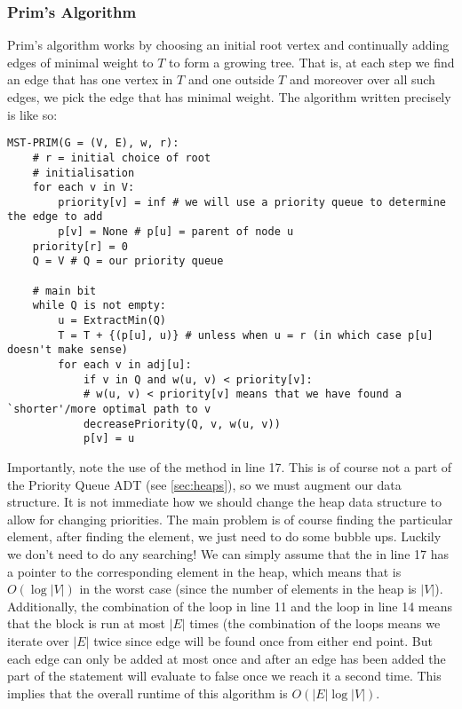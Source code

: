 \subsubsection{Prim's Algorithm}
Prim's algorithm works by choosing an initial root vertex and continually adding edges of minimal weight to $T$ to form a growing tree. That is, at each step we find an edge that has one vertex in $T$ and one outside $T$ and moreover over all such edges, we pick the edge that has minimal weight. The algorithm written precisely is like so:
\begin{lstlisting}
MST-PRIM(G = (V, E), w, r):
    # r = initial choice of root
    # initialisation
    for each v in V:
        priority[v] = inf # we will use a priority queue to determine the edge to add
        p[v] = None # p[u] = parent of node u
    priority[r] = 0
    Q = V # Q = our priority queue
    
    # main bit
    while Q is not empty:
        u = ExtractMin(Q)
        T = T + {(p[u], u)} # unless when u = r (in which case p[u] doesn't make sense)
        for each v in adj[u]:
            if v in Q and w(u, v) < priority[v]:
            # w(u, v) < priority[v] means that we have found a `shorter'/more optimal path to v
            decreasePriority(Q, v, w(u, v))
            p[v] = u
\end{lstlisting}
Importantly, note the use of the method  in line 17. This is of course not a part of the Priority Queue ADT (see \autoref{sec:heaps}), so we must augment our data structure. It is not immediate how we should change the heap data structure to allow for changing priorities. The main problem is of course finding the particular element, after finding the element, we just need to do some bubble ups. Luckily we don't need to do any searching! We can simply assume that the  in line 17 has a pointer to the corresponding element in the heap, which means that  is $O(\log \left| V \right|)$ in the worst case (since the number of elements in the heap is $\left| V \right|$). Additionally, the combination of the  loop in line 11 and the  loop in line 14 means that the  block is run at most $\left| E \right|$ times (the combination of the loops means we iterate over $|E|$ twice since edge will be found once from either end point. But each edge can only be added at most once and after an edge has been added the  part of the  statement will evaluate to false once we reach it a second time. This implies that the overall runtime of this algorithm is $O(\left|E\right| \log \left|V\right|)$.

